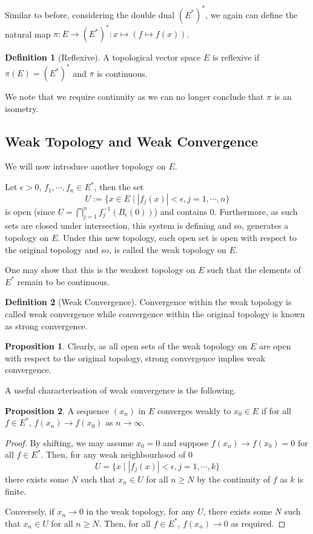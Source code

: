 \documentclass[]{article}
\theoremstyle{definition}
\theoremstyle{definition}
\newtheorem{definition}{Definition}[section]
\newtheorem{proposition}{Proposition}[section]
\begin{document}
Similar to before, considering the double dual \((E^*)^*\), we again can define 
the natural map \(\pi : E \to (E^*)^* : x \mapsto (f \mapsto f(x))\). 

\begin{definition}[Reflexive]
  A topological vector space \(E\) is reflexive if \(\pi(E) = (E^*)^*\) 
  and \(\pi\) is continuous.
\end{definition}

We note that we require continuity as we can no longer conclude that \(\pi\) 
is an isometry.

\subsection{Weak Topology and Weak Convergence}

We will now introduce another topology on \(E\). 

Let \(\epsilon > 0\), \(f_1, \cdots, f_n \in E^*\), then the set 
\[U := \{x \in E \mid |f_j(x)| < \epsilon, j = 1, \cdots, n\}\]
is open (since \(U = \bigcap_{j = 1}^n f_j^{-1}(B_\epsilon(0))\)) and 
contains 0. Furthermore, as such sets are closed under intersection, 
this system is defining and so, generates a topology on \(E\). Under 
this new topology, each open set is open with respect to the original topology 
and so, is called the weak topology on \(E\). 

One may show that this is the weakest topology on \(E\) such that the elements of 
\(E^*\) remain to be continuous.

\begin{definition}[Weak Convergence]
  Convergence within the weak topology is called weak convergence while 
  convergence within the original topology is known as strong convergence.
\end{definition}

\begin{proposition}
  Clearly, as all open sets of the weak topology on \(E\) are open with respect 
  to the original topology, strong convergence implies weak convergence. 
\end{proposition}

A useful characterisation of weak convergence is the following.

\begin{proposition}
  A sequence \((x_n)\) in \(E\) converges weakly to \(x_0 \in E\) if for all 
  \(f \in E^*\), \(f(x_n) \to f(x_0)\) as \(n \to \infty\).
\end{proposition}
\begin{proof}
  By shifting, we may assume \(x_0 = 0\) and suppose \(f(x_n) \to f(x_0) = 0\) 
  for all \(f \in E^*\). Then, for any weak neighbourhood of 0
  \[U = \{x \mid |f_j(x)| < \epsilon, j = 1, \cdots, k\}\]
  there exists some \(N\) such that \(x_n \in U\) for all \(n \ge N\) 
  by the continuity of \(f\) as \(k\) is finite.

  Conversely, if \(x_n \to 0\) in the weak topology, for any \(U\), there exists 
  some \(N\) such that \(x_n \in U\) for all \(n \ge N\). Then, for 
  all \(f \in E^*\), \(f(x_n) \to 0\) as required.
\end{proof}
\end{document}
